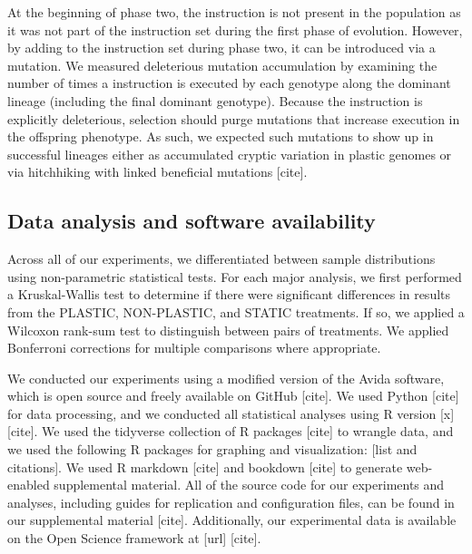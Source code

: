 At the beginning of phase two, the  instruction is not present in the population as it was not part of the instruction set during the first phase of evolution.
However, by adding  to the instruction set during phase two, it can be introduced via a mutation.
We measured deleterious mutation accumulation by examining the number of times a  instruction is executed by each genotype along the dominant lineage (including the final dominant genotype).
Because the  instruction is explicitly deleterious, selection should purge mutations that increase  execution in the offspring phenotype.
As such, we expected such mutations to show up in successful lineages either as accumulated cryptic variation in plastic genomes or via hitchhiking with linked beneficial mutations [cite].

\vspace{0.5cm}
\subsection{Data analysis and software availability}

Across all of our experiments, we differentiated between sample distributions using non-parametric statistical tests.
For each major analysis, we first performed a Kruskal-Wallis test \citep{kruskal_use_1952} to 
determine if there were significant differences in results from the PLASTIC, NON-PLASTIC, and STATIC treatments.
If so, we applied a Wilcoxon rank-sum test \citep{kotz_individual_1992} to distinguish between pairs of treatments.
We applied Bonferroni corrections for multiple comparisons \citep{rice_analyzing_1989} where appropriate.

We conducted our experiments using a modified version of the Avida software, which is open source and freely available on GitHub [cite].
We used Python [cite] for data processing, and we conducted all statistical analyses using R version [x] [cite].
We used the tidyverse collection of R packages [cite] to wrangle data, and we used the following R packages for graphing and visualization: [list and citations].
We used R markdown [cite] and bookdown [cite] to generate web-enabled supplemental material.
All of the source code for our experiments and analyses, including guides for replication and configuration files, can be found in our supplemental material [cite].
Additionally, our experimental data is available on the Open Science framework at [url] [cite].